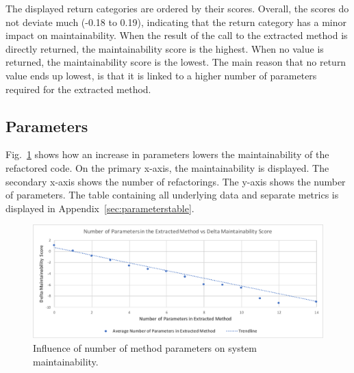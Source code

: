 The displayed return categories are ordered by their scores. Overall, the scores do not deviate much (-0.18 to 0.19), indicating that the return category has a minor impact on maintainability. When the result of the call to the extracted method is directly returned, the maintainability score is the highest. When no value is returned, the maintainability score is the lowest. The main reason that no return value ends up lowest, is that it is linked to a higher number of parameters required for the extracted method.

\subsection{Parameters}
Fig.~\ref{fig:arguments} shows how an increase in parameters lowers the maintainability of the refactored code. On the primary x-axis, the maintainability is displayed. The secondary x-axis shows the number of refactorings. The y-axis shows the number of parameters. The table containing all underlying data and separate metrics is displayed in Appendix~\ref{sec:parameterstable}.

\begin{figure}[H]
  \centering
  \includegraphics[width=0.8\columnwidth]{img/arguments}
  \caption{Influence of number of method parameters on system maintainability.}
  \label{fig:arguments}
\end{figure}
